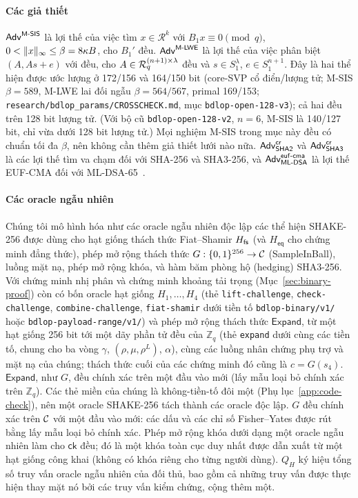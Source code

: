 \paragraph{Các giả thiết}
$\mathsf{Adv}^{\textsf{M-SIS}}$ là lợi thế của việc tìm $x\in\mathcal R^k$ với
$B_1x\equiv0\pmod q$, $0<\lVert x \rVert_\infty\le\beta=8\kappa B$, cho $B_1'$ đều.
$\mathsf{Adv}^{\textsf{M-LWE}}$ là lợi thế của việc phân biệt $(A,As+e)$ với đều, cho
$A\in\mathcal{R}_q^{(n+1)\times\lambda}$ đều và $s\in S_1^\lambda$, $e\in S_1^{n+1}$.
Đây là hai thể hiện được ước lượng ở 172/156 và 164/150 bit (core-SVP cổ
điển/lượng tử; M-SIS $\beta=589$, M-LWE lai đối ngẫu $\beta=564/567$, primal
169/153; \texttt{research/bdlop\_params/CROSSCHECK.md}, mục
\texttt{bdlop-open-128-v3}); cả hai đều trên 128 bit lượng tử. (Với bộ cũ
\texttt{bdlop-open-128-v2}, $n=6$, M-SIS là 140/127 bit, chỉ vừa dưới 128 bit
lượng tử.) Mọi nghiệm M-SIS trong mục này đều có chuẩn tối đa $\beta$, nên không
cần thêm giả thiết lưới nào nữa.
$\mathsf{Adv}^{\mathsf{cr}}_{\mathsf{SHA2}}$ và $\mathsf{Adv}^{\mathsf{cr}}_{\mathsf{SHA3}}$ là
các lợi thế tìm va chạm đối với SHA-256 và SHA3-256, và
$\mathsf{Adv}^{\mathsf{euf\text{-}cma}}_{\mathsf{ML\text{-}DSA}}$ là lợi thế EUF-CMA đối
với ML-DSA-65~\cite{ref:fips204}.

\paragraph{Các oracle ngẫu nhiên}
Chúng tôi mô hình hóa như các oracle ngẫu nhiên độc lập các thể hiện SHAKE-256
được dùng cho hạt giống thách thức Fiat--Shamir $H_{\mathsf{fs}}$ (và $H_{\mathsf{eq}}$ cho
chứng minh đẳng thức), phép mở rộng thách thức $G:\{0,1\}^{256}\to\mathcal{C}$
(\textsf{SampleInBall}), luồng mặt nạ, phép mở rộng khóa, và hàm băm phòng hộ
(hedging) SHA3-256. Với chứng minh nhị phân và chứng minh khoảng tải trọng
(Mục~\ref{sec:binary-proof}) còn có bốn oracle hạt giống $H_1,\dots,H_4$ (thẻ
\texttt{lift-challenge}, \texttt{check-challenge}, \texttt{combine-challenge},
\texttt{fiat-shamir} dưới tiền tố \texttt{bdlop-binary/v1/} hoặc
\texttt{bdlop-payload-range/v1/}) và phép mở rộng thách thức
$\mathsf{Expand}$, từ một hạt giống 256 bit tới một dãy phần tử đều của
$\mathbb Z_q$ (thẻ \texttt{expand} dưới cùng
các tiền tố, chung cho ba vòng $\gamma$, $(\rho,\mu,\rho^L)$, $\alpha$), cùng
các luồng nhân chứng phụ trợ và mặt nạ của chúng; thách thức cuối của các chứng
minh đó cũng là $c=G(s_4)$. $\mathsf{Expand}$, như $G$, đều chính xác trên một
đầu vào mới (lấy mẫu loại bỏ chính xác trên $\mathbb Z_q$). Các thẻ miền của chúng là không-tiền-tố đôi một
(Phụ lục~\ref{app:code-check}), nên một oracle SHAKE-256 tách thành các oracle
độc lập. $G$ đều chính xác trên $\mathcal{C}$ với một đầu vào mới: các dấu và các chỉ
số Fisher--Yates được rút bằng lấy mẫu loại bỏ chính xác. Phép mở rộng khóa
dưới dạng một oracle ngẫu nhiên làm cho $\mathsf{ck}$ đều; đó là một khóa toàn
cục duy nhất được dẫn xuất từ một hạt giống công khai (không có khóa riêng cho
từng người dùng). $Q_H$ ký hiệu tổng số truy vấn oracle ngẫu nhiên của đối thủ,
bao gồm cả những truy vấn được thực hiện thay mặt nó bởi các truy vấn kiểm
chứng, cộng thêm một.

